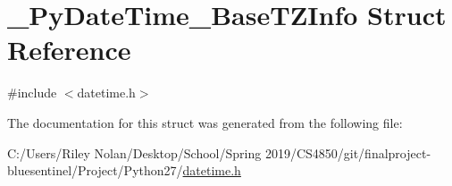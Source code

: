 \hypertarget{struct___py_date_time___base_t_z_info}{}\section{\+\_\+\+Py\+Date\+Time\+\_\+\+Base\+T\+Z\+Info Struct Reference}
\label{struct___py_date_time___base_t_z_info}


{\ttfamily \#include $<$datetime.\+h$>$}



The documentation for this struct was generated from the following file\+:\begin{DoxyCompactItemize}
\item 
C\+:/\+Users/\+Riley Nolan/\+Desktop/\+School/\+Spring 2019/\+C\+S4850/git/finalproject-\/bluesentinel/\+Project/\+Python27/\mbox{\hyperlink{datetime_8h}{datetime.\+h}}\end{DoxyCompactItemize}
